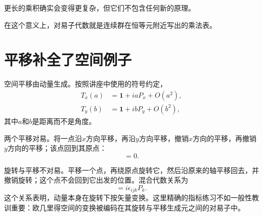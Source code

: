 \begin{classroomqa}
\end{classroomqa}

更长的乘积确实会变得更复杂，但它们不包含任何新的原理。

\begin{classroomqa}
\end{classroomqa}

在这个意义上，对易子代数就是连续群在恒等元附近写出的乘法表。

\section{平移补全了空间例子}

空间平移由动量生成。按照讲座中使用的符号约定，
\begin{equation}
\begin{aligned}
T_x(a)&=\mathbf 1+iaP_x+O(a^2),\\
T_y(b)&=\mathbf 1+ibP_y+O(b^2),
\end{aligned}
\end{equation}
其中\(a\)和\(b\)是距离而不是角度。

两个平移对易。将一点沿\(x\)方向平移，再沿\(y\)方向平移，撤销\(x\)方向的平移，再撤销\(y\)方向的平移；该点回到其原点：
\begin{equation}
[P_i,P_j]=0.
\end{equation}

\begin{classroomqa}
\end{classroomqa}

旋转与平移不对易。平移一个点，再绕原点旋转它，然后沿原来的轴平移回去，并撤销旋转；这个点不会回到它出发的位置。混合代数关系为
\begin{equation}
[L_i,P_j]=i\epsilon_{ijk}P_k.
\end{equation}
这个关系表明，动量本身在旋转下按矢量变换。这里精确的指标练习不如一般性教训重要：欧几里得空间的变换被编码在其旋转与平移生成元之间的对易子中。

